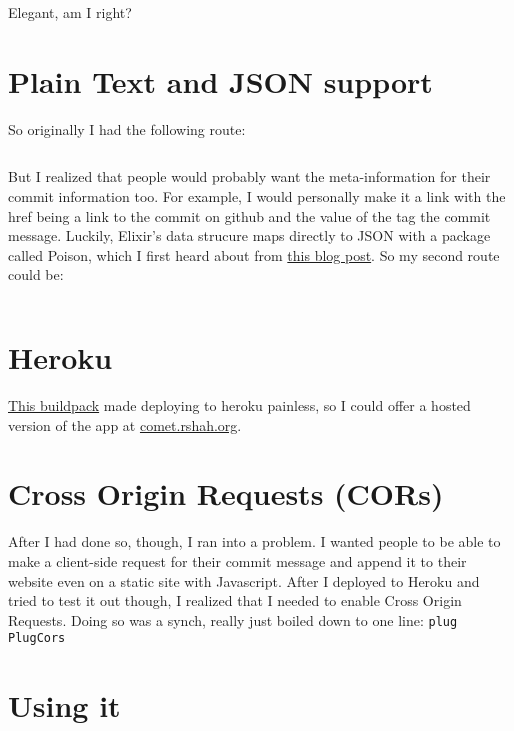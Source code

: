 \documentclass[12pt]{article}
\begin{document}
  \inputminted[firstline=4, lastline=11]{elixir}{../resources/elixir-of-life/script.ex}

  Elegant, am I right?

  \section{Plain Text and JSON support}

  So originally I had the following route:

  \inputminted[firstline=13, lastline=19]{elixir}{../resources/elixir-of-life/script.ex}


  But I realized that people would probably want the meta-information for their commit information too. For example, I would personally make it a link with the href being a link to the commit on github and the value of the tag the commit message. Luckily, Elixir's data strucure maps directly to JSON with a package called Poison, which I first heard about from \href{http://www.jarredtrost.com/2015/05/30/getting-started-with-elixir-plug-routes/}{this blog post}. So my second route could be:

  \inputminted[firstline=21, lastline=27]{elixir}{../resources/elixir-of-life/script.ex}


  \section{Heroku}

  \href{https://github.com/HashNuke/heroku-buildpack-elixir-test}{This buildpack} made deploying to heroku painless, so I could offer a hosted version of the app at \href{http://comet.rshah.org}{comet.rshah.org}.

   \section{Cross Origin Requests (CORs)}

  After I had done so, though, I ran into a problem. I wanted people to be able to make a client-side request for their commit message and append it to their website even on a static site with Javascript. After I deployed to Heroku and tried to test it out though, I realized that I needed to enable Cross Origin Requests. Doing so was a synch, really just boiled down to one line: \texttt{plug PlugCors}

  \section{Using it}
\end{document}
